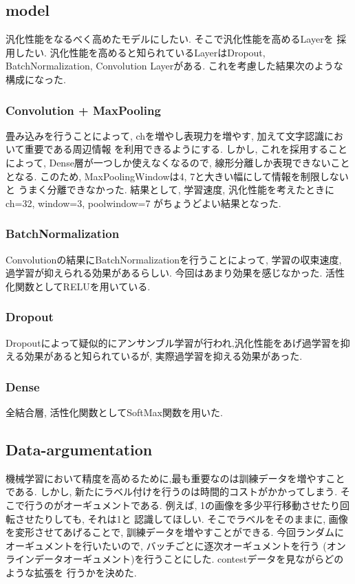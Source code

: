 \documentclass[a4paper,11pt]{jsarticle}
\begin{document}
\subsection{model}
汎化性能をなるべく高めたモデルにしたい. そこで汎化性能を高めるLayerを
採用したい. 汎化性能を高めると知られているLayerはDropout, BatchNormalization, Convolution
Layerがある. これを考慮した結果次のような構成になった.
\subsubsection*{Convolution + MaxPooling}
畳み込みを行うことによって, chを増やし表現力を増やす, 加えて文字認識において重要である周辺情報
を利用できるようにする. しかし, これを採用することによって, Dense層が一つしか使えなくなるので,
線形分離しか表現できないこととなる. このため, MaxPoolingWindowは4, 7と大きい幅にして情報を制限しないと
うまく分離できなかった. 結果として, 学習速度, 汎化性能を考えたときに ch=32, window=3, poolwindow=7
がちょうどよい結果となった.
\subsubsection*{BatchNormalization}
Convolutionの結果にBatchNormalizationを行うことによって, 学習の収束速度, 過学習が抑えられる効果があるらしい.
今回はあまり効果を感じなかった. 活性化関数としてRELUを用いている.
\subsubsection*{Dropout}
Dropoutによって疑似的にアンサンブル学習が行われ,汎化性能をあげ過学習を抑える効果があると知られているが,
実際過学習を抑える効果があった.
\subsubsection*{Dense}
全結合層, 活性化関数としてSoftMax関数を用いた.
\subsection{Data-argumentation}
機械学習において精度を高めるために,最も重要なのは訓練データを増やすことである.
しかし, 新たにラベル付けを行うのは時間的コストがかかってしまう.
そこで行うのがオーギュメントである. 例えば, 1の画像を多少平行移動させたり回転させたりしても, それは1と
認識してほしい. そこでラベルをそのままに, 画像を変形させてあげることで, 訓練データを増やすことができる.
今回ランダムにオーギュメントを行いたいので, バッチごとに逐次オーギュメントを行う
(オンラインデータオーギュメント)を行うことにした. contestデータを見ながらどのような拡張を
行うかを決めた.
\end{document}
